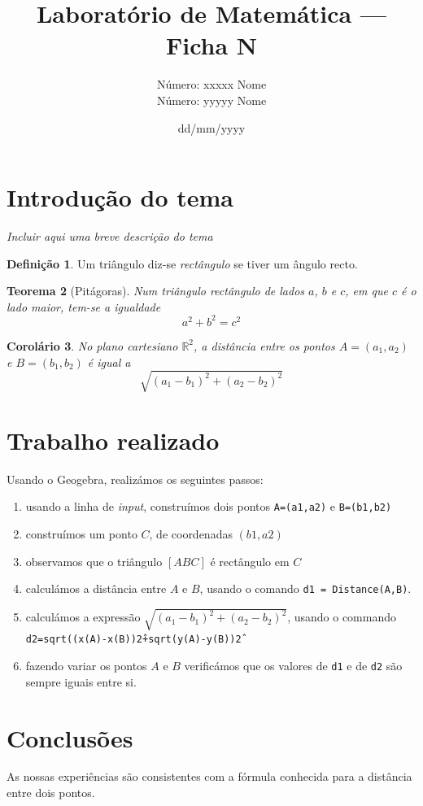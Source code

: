 \documentclass[a4paper]{article}
\title{Laboratório de Matemática --- Ficha N}
\author{Número: xxxxx Nome\\
        Número: yyyyy Nome\\
}
\date{dd/mm/yyyy}
\newcommand{\R}{\mathbb{R}}
\theoremstyle{definition}
\newtheorem{defin}{Definição}
\theoremstyle{plain}
\newtheorem{theorem}[defin]{Teorema}
\newtheorem{corollary}[defin]{Corolário}
\begin{document}
\maketitle


\section{Introdução do tema}

\emph{\small Incluir aqui uma breve descrição do tema}

\begin{defin}
Um triângulo diz-se \emph{rectângulo} se tiver um ângulo recto.
\end{defin}

\begin{theorem}[Pitágoras]
Num triângulo rectângulo de lados $a$, $b$ e $c$, em que $c$ é o lado maior, tem-se a igualdade
$$ a^2 + b^2 = c^2 $$
\end{theorem}

\begin{corollary}
No plano cartesiano $\R^2$, a distância entre os pontos $A=(a_1,a_2)$ e $B=(b_1,b_2)$ é igual a
$$ \sqrt{(a_1-b_1)^2 + (a_2-b_2)^2} $$
\end{corollary}
\section{Trabalho realizado}


%

Usando o Geogebra, realizámos os seguintes passos:

\begin{enumerate}
\item usando a linha de \emph{input}, construímos dois pontos \texttt{A=(a1,a2)} e \texttt{B=(b1,b2)}
\item construímos um ponto $C$, de coordenadas $(b1,a2)$
\item observamos que o triângulo $[ABC]$ é rectângulo em $C$
\item calculámos a distância entre $A$ e $B$, usando o comando \texttt{d1 = Distance(A,B)}.
\item calculámos a expressão $\sqrt{(a_1-b_1)^2 + (a_2-b_2)^2}$, usando o commando\\ \texttt{d2=sqrt((x(A)-x(B))\^2+sqrt(y(A)-y(B))\^2}

\item fazendo variar os pontos $A$ e $B$ verificámos que os valores de \texttt{d1} e de \texttt{d2} são sempre iguais entre si.
\end{enumerate}

\section{Conclusões}

As nossas experiências são consistentes com a fórmula conhecida para a distância entre dois pontos.

\end{document}
